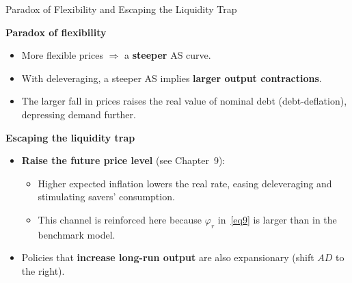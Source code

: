 \documentclass[11pt,aspectratio=169]{beamer}
\begin{document}
\begin{frame}{Paradox of Flexibility and Escaping the Liquidity Trap}
\small

\textbf{Paradox of flexibility}
\begin{itemize}
  \item More flexible prices $\Rightarrow$ a \textbf{steeper} AS curve.
  \item With deleveraging, a steeper AS implies \textbf{larger output contractions}.
  \item The larger fall in prices raises the real value of nominal debt (debt-deflation), depressing demand further.
\end{itemize}

\vspace{0.6em}
\textbf{Escaping the liquidity trap}
\begin{itemize}
  \item \textbf{Raise the future price level} (see Chapter~9):
  \begin{itemize}
    \item Higher expected inflation lowers the real rate, easing deleveraging and stimulating savers' consumption.
    \item This channel is reinforced here because $\varphi_r$ in~\eqref{eq9} is larger than in the benchmark model.
  \end{itemize}
  \item Policies that \textbf{increase long-run output} are also expansionary (shift $AD$ to the right).
\end{itemize}
\end{frame}

\end{document}
